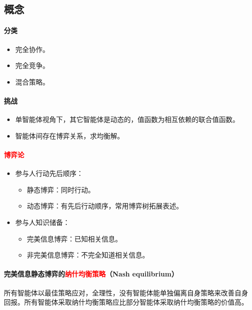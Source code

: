 \documentclass[
12pt, %
a4paper, 
oneside, %
]{scrartcl}
\begin{document}
\subsection[概念]{概念}
\noindent
\begin{minipage}{0.3\textwidth}
\paragraph{分类}
\begin{itemize}
\item 完全协作。
\item 完全竞争。
\item 混合策略。
\end{itemize}
\end{minipage}
\begin{minipage}{0.7\textwidth}
\paragraph{挑战}
\begin{itemize}
\item 单智能体视角下，其它智能体是动态的，值函数为相互依赖的联合值函数。
\item 智能体间存在博弈关系，求均衡解。
\end{itemize}
\end{minipage}
\paragraph{\textcolor{red}{博弈论}}
\begin{itemize}
\item 参与人行动先后顺序：
\begin{itemize}
\item 静态博弈：同时行动。
\item 动态博弈：有先后行动顺序，常用博弈树拓展表述。
\end{itemize}
\item 参与人知识储备：
\begin{itemize}
\item 完美信息博弈：已知相关信息。
\item 非完美信息博弈：不完全知道相关信息。
\end{itemize}
\end{itemize}
\paragraph{完美信息静态博弈的\textcolor{red}{纳什均衡策略}（Nash equilibrium）}
所有智能体以最佳策略应对，全理性，没有智能体能单独偏离自身策略来改善自身回报。所有智能体采取纳什均衡策略应比部分智能体采取纳什均衡策略的价值高。
\end{document}
